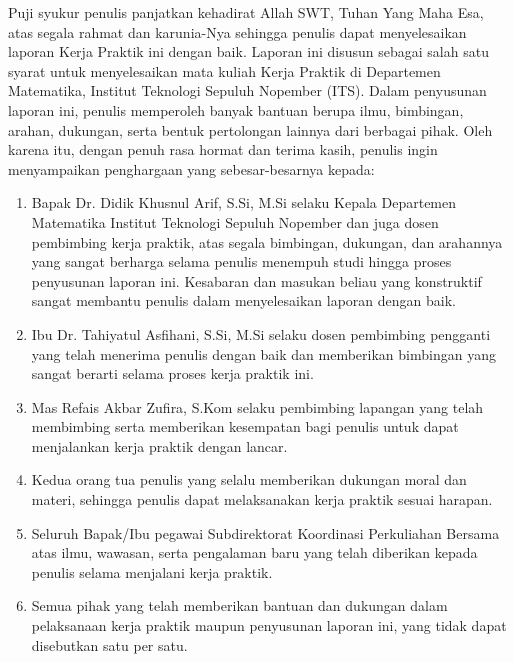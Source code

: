 \documentclass{file/KP-ITS}
\theoremstyle{definition}
\theoremstyle{definition}
\theoremstyle{plain}
\begin{document}

\BagianAwal
\Cover
\LembarJudul
\TitlePage
\LembarPengesahanDepartemen
\LembarPengesahanInstansi
\LembarOrisinalitas

\restoregeometry
\KataPengantar
Puji syukur penulis panjatkan kehadirat Allah SWT, Tuhan Yang Maha Esa, atas segala rahmat dan karunia-Nya sehingga penulis dapat menyelesaikan laporan Kerja Praktik ini dengan baik. Laporan ini disusun sebagai salah satu syarat untuk menyelesaikan mata kuliah Kerja Praktik di Departemen Matematika, Institut Teknologi Sepuluh Nopember (ITS). Dalam penyusunan laporan ini, penulis memperoleh banyak bantuan berupa ilmu, bimbingan, arahan, dukungan, serta bentuk pertolongan lainnya dari berbagai pihak. Oleh karena itu, dengan penuh rasa hormat dan terima kasih, penulis ingin menyampaikan penghargaan yang sebesar-besarnya kepada:

\begin{enumerate}
  \item Bapak Dr. Didik Khusnul Arif, S.Si, M.Si selaku Kepala Departemen Matematika Institut Teknologi Sepuluh Nopember dan juga dosen pembimbing kerja praktik, atas segala bimbingan, dukungan, dan arahannya yang sangat berharga selama penulis menempuh studi hingga proses penyusunan laporan ini. Kesabaran dan masukan beliau yang konstruktif sangat membantu penulis dalam menyelesaikan laporan dengan baik.
  \item Ibu Dr. Tahiyatul Asfihani, S.Si, M.Si selaku dosen pembimbing pengganti yang telah menerima penulis dengan baik dan memberikan bimbingan yang sangat berarti selama proses kerja praktik ini.
  \item Mas Refais Akbar Zufira, S.Kom selaku pembimbing lapangan yang telah membimbing serta memberikan kesempatan bagi penulis untuk dapat menjalankan kerja praktik dengan lancar.
  \item Kedua orang tua penulis yang selalu memberikan dukungan moral dan materi, sehingga penulis dapat melaksanakan kerja praktik sesuai harapan.
  \item Seluruh Bapak/Ibu pegawai Subdirektorat Koordinasi Perkuliahan Bersama atas ilmu, wawasan, serta pengalaman baru yang telah diberikan kepada penulis selama menjalani kerja praktik.
  \item Semua pihak yang telah memberikan bantuan dan dukungan dalam pelaksanaan kerja praktik maupun penyusunan laporan ini, yang tidak dapat disebutkan satu per satu.
\end{enumerate}
\end{document}
